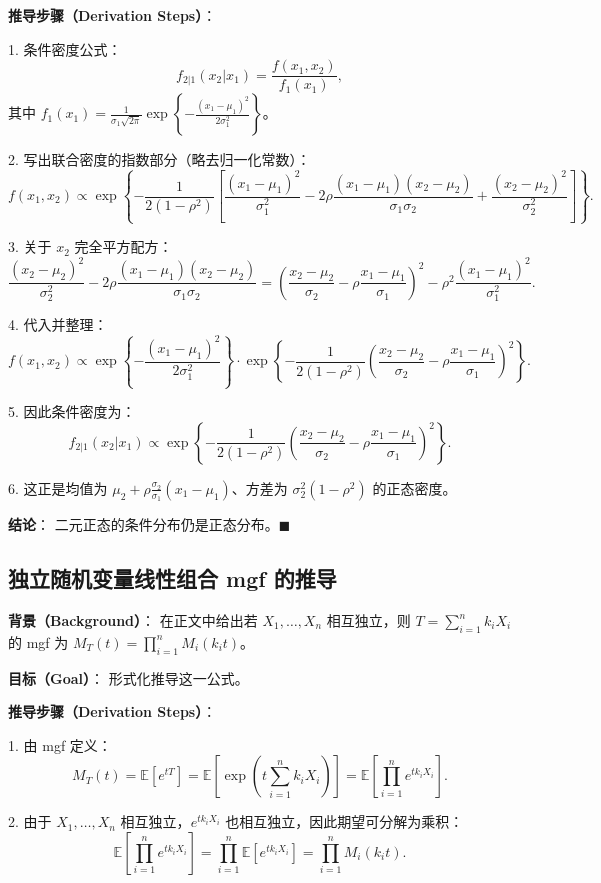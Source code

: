 \textbf{推导步骤（Derivation Steps）}：

1. 条件密度公式：
\[
f_{2|1}(x_2|x_1) = \frac{f(x_1, x_2)}{f_1(x_1)},
\]
其中 $f_1(x_1) = \frac{1}{\sigma_1 \sqrt{2\pi}} \exp\left\{-\frac{(x_1-\mu_1)^2}{2\sigma_1^2}\right\}$。

2. 写出联合密度的指数部分（略去归一化常数）：
\[
f(x_1, x_2) \propto \exp\left\{ -\frac{1}{2(1-\rho^2)} \left[ \frac{(x_1-\mu_1)^2}{\sigma_1^2} - 2\rho\frac{(x_1-\mu_1)(x_2-\mu_2)}{\sigma_1\sigma_2} + \frac{(x_2-\mu_2)^2}{\sigma_2^2} \right] \right\}.
\]

3. 关于 $x_2$ 完全平方配方：
\[
\frac{(x_2-\mu_2)^2}{\sigma_2^2} - 2\rho\frac{(x_1-\mu_1)(x_2-\mu_2)}{\sigma_1\sigma_2} = \left(\frac{x_2-\mu_2}{\sigma_2} - \rho\frac{x_1-\mu_1}{\sigma_1}\right)^2 - \rho^2\frac{(x_1-\mu_1)^2}{\sigma_1^2}.
\]

4. 代入并整理：
\[
f(x_1, x_2) \propto \exp\left\{ -\frac{(x_1-\mu_1)^2}{2\sigma_1^2} \right\} \cdot \exp\left\{ -\frac{1}{2(1-\rho^2)} \left(\frac{x_2-\mu_2}{\sigma_2} - \rho\frac{x_1-\mu_1}{\sigma_1}\right)^2 \right\}.
\]

5. 因此条件密度为：
\[
f_{2|1}(x_2|x_1) \propto \exp\left\{ -\frac{1}{2(1-\rho^2)} \left(\frac{x_2-\mu_2}{\sigma_2} - \rho\frac{x_1-\mu_1}{\sigma_1}\right)^2 \right\}.
\]

6. 这正是均值为 $\mu_2 + \rho\frac{\sigma_2}{\sigma_1}(x_1 - \mu_1)$、方差为 $\sigma_2^2(1-\rho^2)$ 的正态密度。

\textbf{结论}：
二元正态的条件分布仍是正态分布。$\blacksquare$

\subsection{独立随机变量线性组合 mgf 的推导}\label{sec:derivation-mgf-linear-combination}

\textbf{背景（Background）}：
在正文中给出若 $X_1, \ldots, X_n$ 相互独立，则 $T = \sum_{i=1}^n k_i X_i$ 的 mgf 为 $M_T(t) = \prod_{i=1}^n M_i(k_i t)$。

\textbf{目标（Goal）}：
形式化推导这一公式。

\textbf{推导步骤（Derivation Steps）}：

1. 由 mgf 定义：
\[
M_T(t) = \mathbb{E}[e^{tT}] = \mathbb{E}\left[\exp\left(t \sum_{i=1}^n k_i X_i\right)\right] = \mathbb{E}\left[\prod_{i=1}^n e^{t k_i X_i}\right].
\]

2. 由于 $X_1, \ldots, X_n$ 相互独立，$e^{t k_i X_i}$ 也相互独立，因此期望可分解为乘积：
\[
\mathbb{E}\left[\prod_{i=1}^n e^{t k_i X_i}\right] = \prod_{i=1}^n \mathbb{E}[e^{t k_i X_i}] = \prod_{i=1}^n M_i(k_i t).
\]

